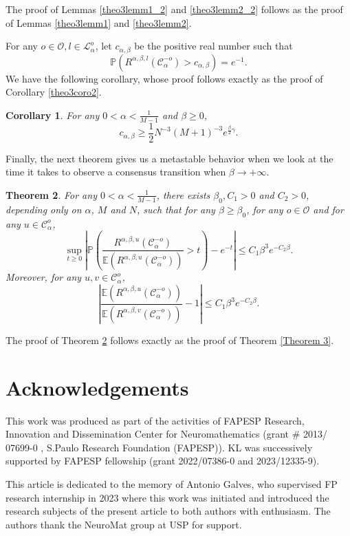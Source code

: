 \documentclass[11pt]{article}
\newtheorem{theorem}{Theorem}
\newtheorem{corollary}[theorem]{Corollary}
\theoremstyle{definition}
\def\P{{\mathbb P}}
\begin{document}
The proof of Lemmas \ref{theo3lemm1_2} and \ref{theo3lemm2_2} follows as the proof of Lemmas \ref{theo3lemm1} and \ref{theo3lemm2}.

For any $o\in\mathcal{O}, l\in\mathcal{L}^{o}_{\alpha}$, 
let $c_{\alpha,\beta}$ be the positive real number such that
$$
    \mathbb{P}(R^{\alpha,\beta,l}(\mathcal{C}^{-o}_{\alpha})>c_{\alpha,\beta})=e^{-1}.
$$
We have the following corollary, whose proof follows exactly as the proof of Corollary \ref{theo3coro2}.

\begin{corollary}\label{theo3coro2_2}
    For any $0<\alpha<\frac{1}{M-1}$ and $\beta \geq 0$,
    $$
       c_{\alpha,\beta} \geq \frac{1}{2}N^{-3}(M+1)^{-3}e^{\frac{\beta}{2}\gamma}.
    $$
\end{corollary}


Finally, the next theorem gives us a metastable behavior when we look at the time it takes to observe a consensus transition when $\beta\rightarrow+\infty$.

\begin{theorem}\label{Theorem 3_2}
For any $0<\alpha<\frac{1}{M-1}$, there exists $\beta_0, C_1>0$ and  $C_2>0$, depending only on $\alpha$, $M$ and $N$, such that for any $\beta\geq \beta_0$, for any $o\in\mathcal{O}$ and for any  $u\in \mathcal{C}^o_\alpha$,
$$
\sup_{t\geq 0}\left|\P\left(\frac{R^{\alpha,\beta,u}(\mathcal{C}^{-o}_{\alpha})}{\mathbb{E}(R^{\alpha,\beta,u}(\mathcal{C}^{-o}_{\alpha}))}>t\right)-e^{-t}\right| \leq C_1\beta^3e^{-C_2 \beta}.
$$
Moreover, for any $u,v \in \mathcal{C}^o_{\alpha}$,
$$
\left|\frac{\mathbb{E}(R^{\alpha,\beta,u}(\mathcal{C}^{-o}_{\alpha}))}{\mathbb{E}(R^{\alpha,\beta,v}(\mathcal{C}^{-o}_{\alpha}))}-1\right| \leq C_1\beta^3e^{-C_2 \beta}.
$$
\end{theorem}

The proof of Theorem \ref{Theorem 3_2} follows exactly as the proof of Theorem \ref{Theorem 3}.




\section*{Acknowledgements}

This work was produced as part of the activities of FAPESP Research, Innovation and Dissemination Center for Neuromathematics (grant \# 2013/ 07699-0 , S.Paulo Research Foundation (FAPESP)). 
KL was successively supported by FAPESP fellowship (grant 2022/07386-0 and 2023/12335-9).

This article is dedicated to the memory of Antonio Galves, who supervised FP research internship in 2023 where this work was initiated and introduced the research subjects of the present article to both authors with enthusiasm. 
The authors thank the NeuroMat group at USP for support.


\printbibliography
\end{document}
